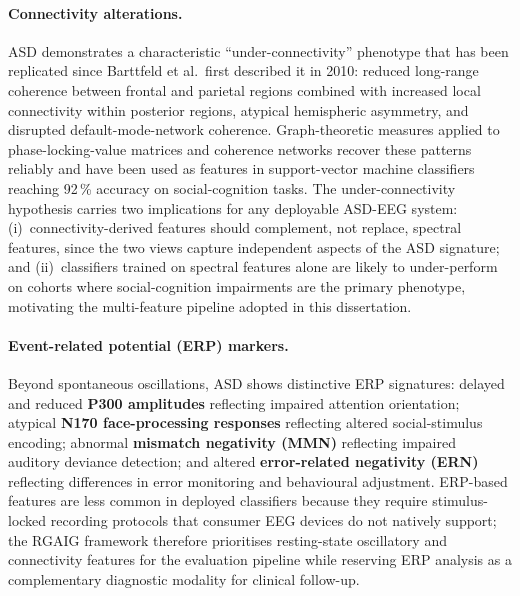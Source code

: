 \paragraph{Connectivity alterations.}
ASD demonstrates a characteristic ``under-connectivity'' phenotype that has been replicated since Barttfeld et al.\ first described it in 2010: reduced long-range coherence between frontal and parietal regions combined with increased local connectivity within posterior regions, atypical hemispheric asymmetry, and disrupted default-mode-network coherence. Graph-theoretic measures applied to phase-locking-value matrices and coherence networks recover these patterns reliably and have been used as features in support-vector machine classifiers reaching 92\,\% accuracy on social-cognition tasks. The under-connectivity hypothesis carries two implications for any deployable ASD-EEG system: (i)~connectivity-derived features should complement, not replace, spectral features, since the two views capture independent aspects of the ASD signature; and (ii)~classifiers trained on spectral features alone are likely to under-perform on cohorts where social-cognition impairments are the primary phenotype, motivating the multi-feature pipeline adopted in this dissertation.

\paragraph{Event-related potential (ERP) markers.}
Beyond spontaneous oscillations, ASD shows distinctive ERP signatures: delayed and reduced \textbf{P300 amplitudes} reflecting impaired attention orientation; atypical \textbf{N170 face-processing responses} reflecting altered social-stimulus encoding; abnormal \textbf{mismatch negativity (MMN)} reflecting impaired auditory deviance detection; and altered \textbf{error-related negativity (ERN)} reflecting differences in error monitoring and behavioural adjustment. ERP-based features are less common in deployed classifiers because they require stimulus-locked recording protocols that consumer EEG devices do not natively support; the RGAIG framework therefore prioritises resting-state oscillatory and connectivity features for the evaluation pipeline while reserving ERP analysis as a complementary diagnostic modality for clinical follow-up.

